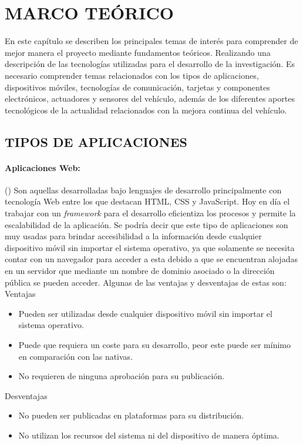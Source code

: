 \section{MARCO TEÓRICO}

En este capítulo se describen los principales temas de interés para comprender de mejor manera el proyecto mediante fundamentos teóricos. Realizando una descripción de las tecnologías utilizadas para el desarrollo de la investigación. Es necesario comprender temas relacionados con los tipos de aplicaciones, dispositivos móviles, tecnologías de comunicación, tarjetas y componentes electrónicos, actuadores y sensores del vehículo, además de los diferentes aportes tecnológicos de la actualidad relacionados con la mejora continua del vehículo.


\subsection{TIPOS DE APLICACIONES}



\paragraph{Aplicaciones Web:}

(\cite{MT-11}) Son aquellas desarrolladas bajo lenguajes de desarrollo principalmente con tecnología Web entre los que destacan HTML, CSS y JavaScript. Hoy en día el trabajar con un \textit{framework} para el desarrollo eficientiza los procesos y permite la escalabilidad de la aplicación. Se podría decir que este tipo de aplicaciones son muy usadas para brindar accesibilidad a la información desde cualquier dispositivo móvil sin importar el sistema operativo, ya que solamente se necesita contar con un navegador para acceder a esta debido a que se encuentran alojadas en un servidor que mediante un nombre de dominio asociado o la dirección pública se pueden acceder. Algunas de las ventajas y desventajas de estas son: \\



Ventajas
\begin{itemize}
\item  Pueden ser utilizadas desde cualquier dispositivo móvil sin importar el sistema operativo.
\item  Puede que requiera un coste para su desarrollo, peor este puede ser mínimo en comparación con las nativas.
\item  No requieren de ninguna aprobación para su publicación.
\end{itemize}
Desventajas
\begin{itemize}
\item  No pueden ser publicadas en plataformas para su distribución.
\item  No utilizan los recursos del sistema ni del dispositivo de manera óptima.
\end{itemize}


